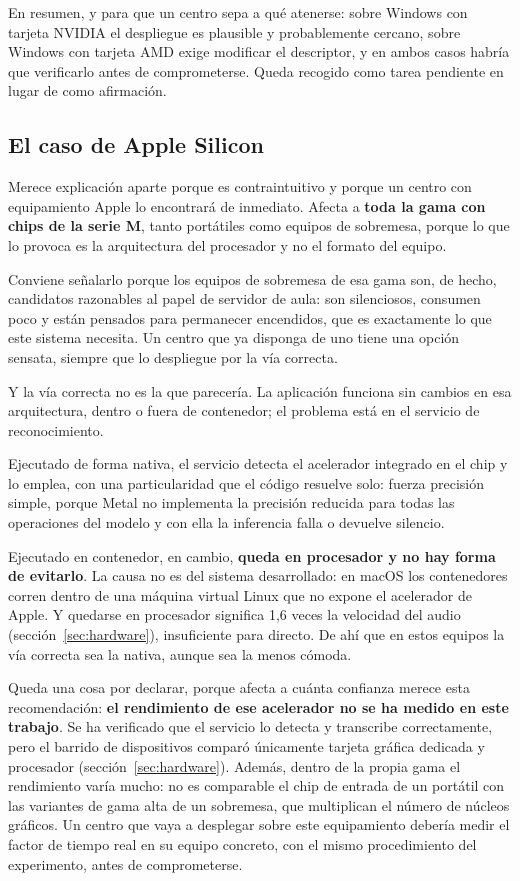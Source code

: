 En resumen, y para que un centro sepa a qué atenerse: sobre Windows con tarjeta NVIDIA el
despliegue es plausible y probablemente cercano, sobre Windows con tarjeta AMD exige
modificar el descriptor, y en ambos casos habría que verificarlo antes de comprometerse.
Queda recogido como tarea pendiente en lugar de como afirmación.

\subsection*{El caso de Apple Silicon}

Merece explicación aparte porque es contraintuitivo y porque un centro con equipamiento
Apple lo encontrará de inmediato. Afecta a \textbf{toda la gama con chips de la serie M},
tanto portátiles como equipos de sobremesa, porque lo que lo provoca es la arquitectura del
procesador y no el formato del equipo.

Conviene señalarlo porque los equipos de sobremesa de esa gama son, de hecho, candidatos
razonables al papel de servidor de aula: son silenciosos, consumen poco y están pensados
para permanecer encendidos, que es exactamente lo que este sistema necesita. Un centro que
ya disponga de uno tiene una opción sensata, siempre que lo despliegue por la vía correcta.

Y la vía correcta no es la que parecería. La aplicación funciona sin cambios en esa
arquitectura, dentro o fuera de contenedor; el problema está en el servicio de
reconocimiento.

Ejecutado de forma nativa, el servicio detecta el acelerador integrado en el chip y lo
emplea, con una particularidad que el código resuelve solo: fuerza precisión simple, porque
Metal no implementa la precisión reducida para todas las operaciones del modelo y con ella
la inferencia falla o devuelve silencio.

Ejecutado en contenedor, en cambio, \textbf{queda en procesador y no hay forma de evitarlo}.
La causa no es del sistema desarrollado: en macOS los contenedores corren dentro de una
máquina virtual Linux que no expone el acelerador de Apple. Y quedarse en procesador
significa 1,6 veces la velocidad del audio (sección~\ref{sec:hardware}), insuficiente para
directo. De ahí que en estos equipos la vía correcta sea la nativa, aunque sea la menos
cómoda.

Queda una cosa por declarar, porque afecta a cuánta confianza merece esta recomendación:
\textbf{el rendimiento de ese acelerador no se ha medido en este trabajo}. Se ha verificado
que el servicio lo detecta y transcribe correctamente, pero el barrido de dispositivos
comparó únicamente tarjeta gráfica dedicada y procesador (sección~\ref{sec:hardware}).
Además, dentro de la propia gama el rendimiento varía mucho: no es comparable el chip de
entrada de un portátil con las variantes de gama alta de un sobremesa, que multiplican el
número de núcleos gráficos. Un centro que vaya a desplegar sobre este equipamiento debería
medir el factor de tiempo real en su equipo concreto, con el mismo procedimiento del
experimento, antes de comprometerse.

